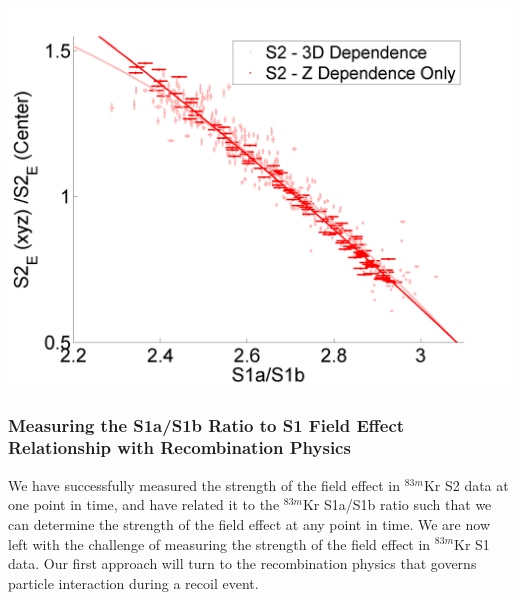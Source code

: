 \documentclass[a4paper,12pt]{article}
\begin{document}
{\begin{center}
\includegraphics[scale=0.6]{Run04Corrections/S1aS1bvField_ZDep_3D_S2Only.png}
 \label{fig:S1aS1bField_S2}
\end{center}


\subsubsection{Measuring the S1a/S1b Ratio to S1 Field Effect Relationship with Recombination Physics} \label{section:S1relation}

We have successfully measured the strength of the field effect in $^{83m}$Kr S2 data at one point in time, and have related it to the $^{83m}$Kr S1a/S1b ratio such that we can determine the strength of the field effect at any point in time.  We are now left with the challenge of measuring the strength of the field effect in $^{83m}$Kr S1 data. Our first approach will turn to the recombination physics that governs particle interaction during a recoil event.  

}
\end{document}
